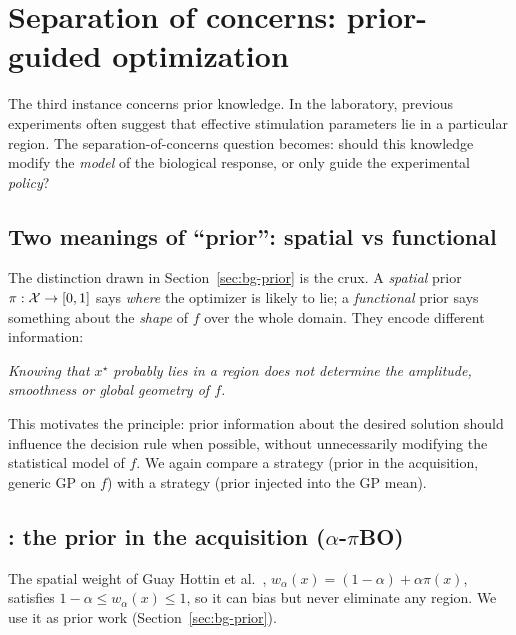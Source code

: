 \section{Separation of concerns: prior-guided optimization}
\label{sec:contrib-prior}

The third instance concerns prior knowledge. In the laboratory, previous
experiments often suggest that effective stimulation parameters lie in a
particular region. The separation-of-concerns question becomes: should this
knowledge modify the \emph{model} of the biological response, or only guide the
experimental \emph{policy}?

\subsection{Two meanings of ``prior'': spatial vs functional}
\label{sec:contrib-prior-two}

The distinction drawn in Section~\ref{sec:bg-prior} is the crux. A
\emph{spatial} prior $\pi:\mathcal{X}\to[0,1]$ says \emph{where} the optimizer is likely
to lie; a \emph{functional} prior says something about the \emph{shape} of $f$
over the whole domain. They encode different information:
\begin{center}
\emph{Knowing that $x^\star$ probably lies in a region does not determine the
amplitude, smoothness or global geometry of $f$.}
\end{center}
This motivates the principle: prior information about the desired solution should
influence the decision rule when possible, without unnecessarily modifying the
statistical model of $f$. We again compare a \RIGHT{} strategy (prior in the
acquisition, generic GP on $f$) with a \WRONG{} strategy (prior injected into the
GP mean). \hfill\Psynth

\subsection{\RIGHT: the prior in the acquisition ($\alpha$-$\pi$BO)}
\label{sec:contrib-prior-right}

The spatial weight of Guay Hottin et al.~\cite{guayhottin2025},
$w_\alpha(x)=(1-\alpha)+\alpha\pi(x)$, satisfies $1-\alpha\le w_\alpha(x)\le1$,
so it can bias but never eliminate any region. We use it as prior work
(Section~\ref{sec:bg-prior}). \hfill\Plit

